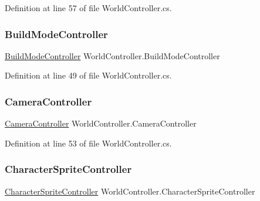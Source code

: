 Definition at line 57 of file World\+Controller.\+cs.

\mbox{\label{class_world_controller_a5d914a05b2ad0e14c7612f48e850d91a}} 
\subsubsection{\texorpdfstring{Build\+Mode\+Controller}{BuildModeController}}
{\footnotesize\ttfamily \hyperlink{class_build_mode_controller}{Build\+Mode\+Controller} World\+Controller.\+Build\+Mode\+Controller\hspace{0.3cm}{\ttfamily [get]}}



Definition at line 49 of file World\+Controller.\+cs.

\mbox{\label{class_world_controller_a16578baf61da3e9d18e543280d2b1f86}} 
\subsubsection{\texorpdfstring{Camera\+Controller}{CameraController}}
{\footnotesize\ttfamily \hyperlink{class_camera_controller}{Camera\+Controller} World\+Controller.\+Camera\+Controller\hspace{0.3cm}{\ttfamily [get]}}



Definition at line 53 of file World\+Controller.\+cs.

\mbox{\label{class_world_controller_acfb5f356950156713748bbba8d318cb2}} 
\subsubsection{\texorpdfstring{Character\+Sprite\+Controller}{CharacterSpriteController}}
{\footnotesize\ttfamily \hyperlink{class_project_porcupine_1_1_entities_1_1_character_sprite_controller}{Character\+Sprite\+Controller} World\+Controller.\+Character\+Sprite\+Controller\hspace{0.3cm}{\ttfamily [get]}}



